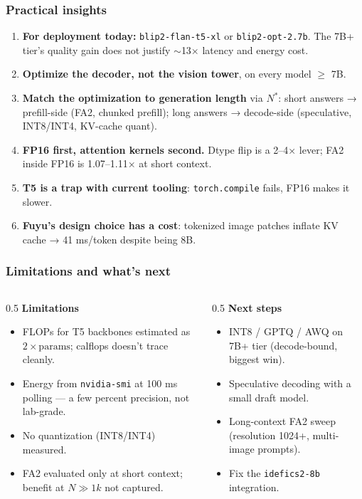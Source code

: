 \documentclass[
	11pt,
	aspectratio=169,
]{beamer}
\begin{document}
\begin{frame}
	\frametitle{Practical insights}

	\footnotesize
	\begin{enumerate}\setlength\itemsep{2pt}
		\item \textbf{For deployment today:} \texttt{blip2-flan-t5-xl} or \texttt{blip2-opt-2.7b}. The 7B+ tier's quality gain does not justify $\sim$13× latency and energy cost.
		\item \textbf{Optimize the decoder, not the vision tower}, on every model $\geq$ 7B.
		\item \textbf{Match the optimization to generation length} via $N^*$: short answers → prefill-side (FA2, chunked prefill); long answers → decode-side (speculative, INT8/INT4, KV-cache quant).
		\item \textbf{FP16 first, attention kernels second.} Dtype flip is a 2–4× lever; FA2 inside FP16 is 1.07–1.11× at short context.
		\item \textbf{T5 is a trap with current tooling}: \texttt{torch.compile} fails, FP16 makes it slower.
		\item \textbf{Fuyu's design choice has a cost}: tokenized image patches inflate KV cache → 41 ms/token despite being 8B.
	\end{enumerate}
\end{frame}


\begin{frame}
	\frametitle{Limitations and what's next}

	\footnotesize
	\begin{columns}[t]
		\begin{column}{0.5\textwidth}
			\textbf{Limitations}
			\begin{itemize}\setlength\itemsep{0pt}
				\item FLOPs for T5 backbones estimated as $2 \times \text{params}$; calflops doesn't trace cleanly.
				\item Energy from \texttt{nvidia-smi} at 100 ms polling — a few percent precision, not lab-grade.
				\item No quantization (INT8/INT4) measured.
				\item FA2 evaluated only at short context; benefit at $N \gg 1k$ not captured.
			\end{itemize}
		\end{column}
		\begin{column}{0.5\textwidth}
			\textbf{Next steps}
			\begin{itemize}\setlength\itemsep{0pt}
				\item INT8 / GPTQ / AWQ on 7B+ tier (decode-bound, biggest win).
				\item Speculative decoding with a small draft model.
				\item Long-context FA2 sweep (resolution 1024+, multi-image prompts).
				\item Fix the \texttt{idefics2-8b} integration.
			\end{itemize}
		\end{column}
	\end{columns}
\end{frame}
\end{document}
